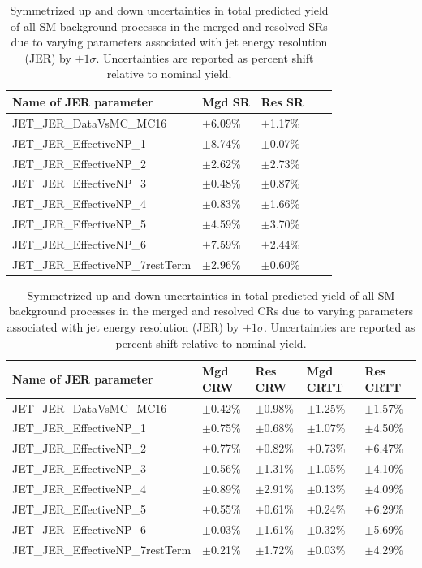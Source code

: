 \begin{table}[ht]
\caption{\label{tab:systs_total_bkg_JET_JER_SR} Symmetrized up and down uncertainties in total predicted yield of all SM background processes in the merged and resolved SRs due to varying parameters associated with jet energy resolution (JER) by \(\pm1\sigma\). Uncertainties are reported as percent shift relative to nominal yield.}
\footnotesize{
\begin{tabular}{l l l l l }
\toprule
\textbf{Name of JER parameter} & \textbf{Mgd SR} & \textbf{Res SR}\tabularnewline
\midrule
\midrule
JET\_JER\_DataVsMC\_MC16 & \(\pm\)6.09\% &\(\pm\)1.17\% \tabularnewline
\midrule
JET\_JER\_EffectiveNP\_1 & \(\pm\)8.74\% &\(\pm\)0.07\% \tabularnewline
\midrule
JET\_JER\_EffectiveNP\_2 & \(\pm\)2.62\% &\(\pm\)2.73\% \tabularnewline
\midrule
JET\_JER\_EffectiveNP\_3 & \(\pm\)0.48\% &\(\pm\)0.87\% \tabularnewline
\midrule
JET\_JER\_EffectiveNP\_4 & \(\pm\)0.83\% &\(\pm\)1.66\% \tabularnewline
\midrule
JET\_JER\_EffectiveNP\_5 & \(\pm\)4.59\% &\(\pm\)3.70\% \tabularnewline
\midrule
JET\_JER\_EffectiveNP\_6 & \(\pm\)7.59\% &\(\pm\)2.44\% \tabularnewline
\midrule
JET\_JER\_EffectiveNP\_7restTerm & \(\pm\)2.96\% &\(\pm\)0.60\% \tabularnewline
\bottomrule
\end{tabular}}
\end{table}

\begin{table}[ht]
\caption{\label{tab:systs_total_bkg_JET_JER_CR} Symmetrized up and down uncertainties in total predicted yield of all SM background processes in the merged and resolved CRs due to varying parameters associated with jet energy resolution (JER) by \(\pm1\sigma\). Uncertainties are reported as percent shift relative to nominal yield.}
\footnotesize{
\begin{tabular}{l l l l l }
\toprule
\textbf{Name of JER parameter} & \textbf{Mgd CRW} & \textbf{Res CRW} & \textbf{Mgd CRTT} & \textbf{Res CRTT}\tabularnewline
\midrule
\midrule
JET\_JER\_DataVsMC\_MC16 & \(\pm\)0.42\% &\(\pm\)0.98\% &\(\pm\)1.25\% &\(\pm\)1.57\% \tabularnewline
\midrule
JET\_JER\_EffectiveNP\_1 & \(\pm\)0.75\% &\(\pm\)0.68\% &\(\pm\)1.07\% &\(\pm\)4.50\% \tabularnewline
\midrule
JET\_JER\_EffectiveNP\_2 & \(\pm\)0.77\% &\(\pm\)0.82\% &\(\pm\)0.73\% &\(\pm\)6.47\% \tabularnewline
\midrule
JET\_JER\_EffectiveNP\_3 & \(\pm\)0.56\% &\(\pm\)1.31\% &\(\pm\)1.05\% &\(\pm\)4.10\% \tabularnewline
\midrule
JET\_JER\_EffectiveNP\_4 & \(\pm\)0.89\% &\(\pm\)2.91\% &\(\pm\)0.13\% &\(\pm\)4.09\% \tabularnewline
\midrule
JET\_JER\_EffectiveNP\_5 & \(\pm\)0.55\% &\(\pm\)0.61\% &\(\pm\)0.24\% &\(\pm\)6.29\% \tabularnewline
\midrule
JET\_JER\_EffectiveNP\_6 & \(\pm\)0.03\% &\(\pm\)1.61\% &\(\pm\)0.32\% &\(\pm\)5.69\% \tabularnewline
\midrule
JET\_JER\_EffectiveNP\_7restTerm & \(\pm\)0.21\% &\(\pm\)1.72\% &\(\pm\)0.03\% &\(\pm\)4.29\% \tabularnewline
\bottomrule
\end{tabular}}
\end{table}

